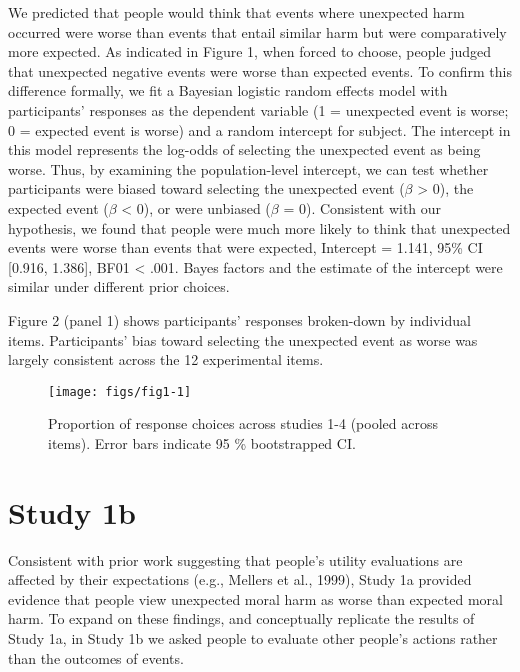 \documentclass[10pt, letterpaper]{article}
\newenvironment{CodeChunk}{}{}
\begin{document}
We predicted that people would think that events where unexpected harm
occurred were worse than events that entail similar harm but were
comparatively more expected. As indicated in Figure 1, when forced to
choose, people judged that unexpected negative events were worse than
expected events. To confirm this difference formally, we fit a Bayesian
logistic random effects model with participants' responses as the
dependent variable (1 = unexpected event is worse; 0 = expected event is
worse) and a random intercept for subject. The intercept in this model
represents the log-odds of selecting the unexpected event as being
worse. Thus, by examining the population-level intercept, we can test
whether participants were biased toward selecting the unexpected event
(\(\beta\) \textgreater{} 0), the expected event (\(\beta\) \textless{}
0), or were unbiased (\(\beta\) = 0). Consistent with our hypothesis, we
found that people were much more likely to think that unexpected events
were worse than events that were expected, Intercept = 1.141, 95\% CI
{[}0.916, 1.386{]}, BF01 \textless{} .001. Bayes factors and the
estimate of the intercept were similar under different prior choices.

Figure 2 (panel 1) shows participants' responses broken-down by
individual items. Participants' bias toward selecting the unexpected
event as worse was largely consistent across the 12 experimental items.

\begin{CodeChunk}
\begin{figure}[H]

{\centering \texttt{[image: figs/fig1-1]} 

}

\caption[Proportion of response choices across studies 1-4 (pooled across items)]{Proportion of response choices across studies 1-4 (pooled across items). Error bars indicate 95 \% bootstrapped CI.}\label{fig:fig1}
\end{figure}
\end{CodeChunk}

\section{Study 1b}\label{study-1b}

Consistent with prior work suggesting that people's utility evaluations
are affected by their expectations (e.g., Mellers et al., 1999), Study
1a provided evidence that people view unexpected moral harm as worse
than expected moral harm. To expand on these findings, and conceptually
replicate the results of Study 1a, in Study 1b we asked people to
evaluate other people's actions rather than the outcomes of events.
\end{document}
